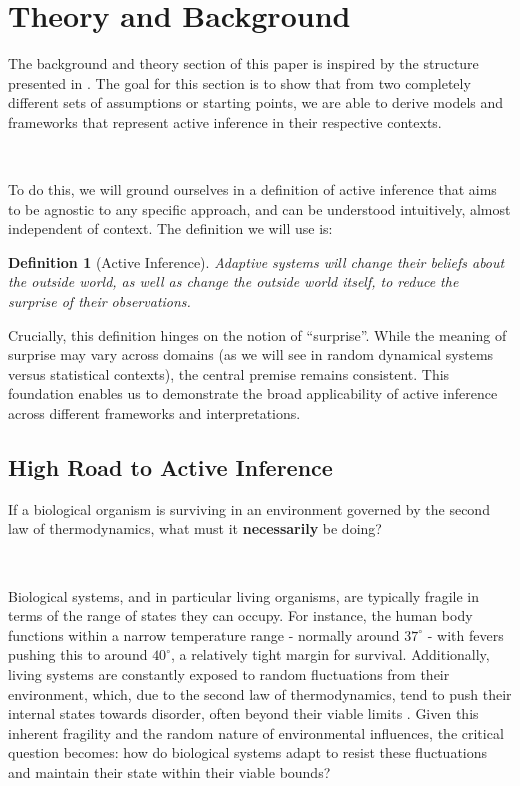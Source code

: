 \documentclass{article}
\newtheorem{definition}{Definition}
\begin{document}
\section{Theory and Background}

The background and theory section of this paper is inspired by the structure presented in \citet{parr2022ActiveInference}. The goal for this section is to show that from two completely different sets of assumptions or starting points, we are able to derive models and frameworks that represent active inference in their respective contexts.

\

To do this, we will ground ourselves in a definition of active inference that aims to be agnostic to any specific approach, and can be understood intuitively, almost independent of context. The definition we will use is:

\begin{definition}[Active Inference]

Adaptive systems will change their beliefs about the outside world, as well as change the outside world itself, to reduce the surprise of their observations.

\end{definition}

Crucially, this definition hinges on the notion of ``surprise''. While the meaning of surprise may vary across domains (as we will see in random dynamical systems versus statistical contexts), the central premise remains consistent. This foundation enables us to demonstrate the broad applicability of active inference across different frameworks and interpretations.


\subsection{High Road to Active Inference}

If a biological organism is surviving in an environment governed by the second law of thermodynamics, what must it \textbf{necessarily} be doing?

\

Biological systems, and in particular living organisms, are typically fragile in terms of the range of states they can occupy. For instance, the human body functions within a narrow temperature range - normally around $37^\circ$ - with fevers pushing this to around $40^\circ$, a relatively tight margin for survival. Additionally, living systems are constantly exposed to random fluctuations from their environment, which, due to the second law of thermodynamics, tend to push their internal states towards disorder, often beyond their viable limits \citep{friston2012free}. Given this inherent fragility and the random nature of environmental influences, the critical question becomes: how do biological systems adapt to resist these fluctuations and maintain their state within their viable bounds?
\end{document}
